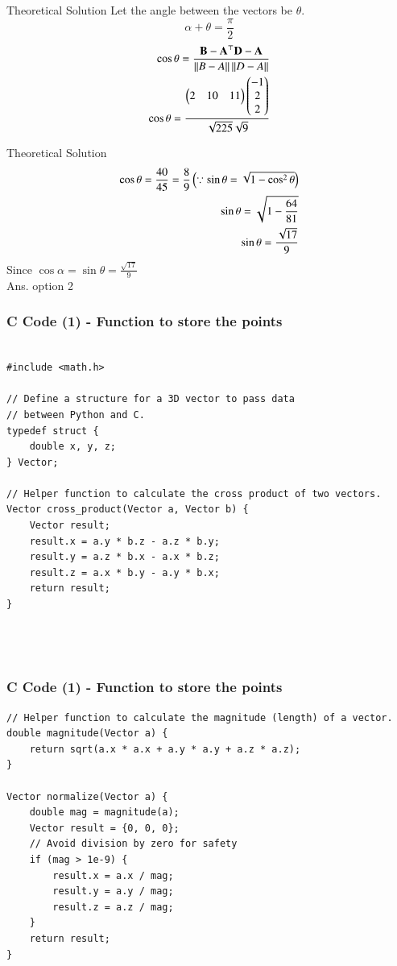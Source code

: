 \documentclass{beamer}
\begin{document}
\begin{frame}{Theoretical Solution} 
Let the angle between the vectors be $\theta$.
$$\alpha+\theta=\frac{\pi}{2}$$
\begin{align}
  \cos\theta=\frac{\mathbf{B-A}^\top\mathbf{D-A}}{\left\lVert B-A\right\rVert\left\lVert D-A\right\rVert}\\
  \cos\theta=\frac{\begin{pmatrix}2&10&11\end{pmatrix}\begin{pmatrix}-1\\2\\2\end{pmatrix}}{\sqrt{225}\sqrt{9}}\\
\end{align}
\end{frame}


\begin{frame}{Theoretical Solution} 
\begin{align}
   \cos\theta=\frac{40}{45}=\frac{8}{9}\left(\because\sin\theta=\sqrt{1-\cos^2\theta}\right)\\
  \sin\theta=\sqrt{1-\frac{64}{81}}\\
  \sin\theta=\frac{\sqrt{17}}{9}
\end{align}
Since $\cos\alpha=\sin\theta=\frac{\sqrt{17}}{9}$\\
Ans. option 2
\end{frame}


\begin{frame}[fragile]
    \frametitle{C Code (1) - Function to store the points }

    \begin{lstlisting}

#include <math.h>

// Define a structure for a 3D vector to pass data
// between Python and C.
typedef struct {
    double x, y, z;
} Vector;

// Helper function to calculate the cross product of two vectors.
Vector cross_product(Vector a, Vector b) {
    Vector result;
    result.x = a.y * b.z - a.z * b.y;
    result.y = a.z * b.x - a.x * b.z;
    result.z = a.x * b.y - a.y * b.x;
    return result;
}




    \end{lstlisting}
\end{frame}

\begin{frame}[fragile]
    \frametitle{C Code (1) - Function to store the points }

    \begin{lstlisting}
// Helper function to calculate the magnitude (length) of a vector.
double magnitude(Vector a) {
    return sqrt(a.x * a.x + a.y * a.y + a.z * a.z);
}

Vector normalize(Vector a) {
    double mag = magnitude(a);
    Vector result = {0, 0, 0};
    // Avoid division by zero for safety
    if (mag > 1e-9) { 
        result.x = a.x / mag;
        result.y = a.y / mag;
        result.z = a.z / mag;
    }
    return result;
}



    \end{lstlisting}
\end{frame}
\end{document}
